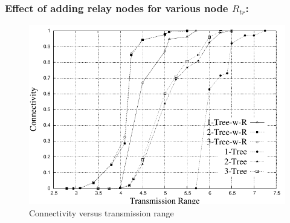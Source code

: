 \documentclass{beamer}
\newcommand{\SRCONN}   { {\mathrm {SR\mbox{-}CONN}} }
\begin{document}
\begin{frame}
\frametitle{Effect of adding relay nodes for various node $R_{tr}$:}

\begin{figure}[!htb]
\begin{minipage}{.9\linewidth}
\end{minipage}
\includegraphics[width=4 in, height=1.75 in]{NetworkI_woR-eps-converted-to.pdf}
\caption{Connectivity versus transmission range}
\label{Fig:NWOR}
\end{figure}

\end{frame}
%
%
%
% 
%
\end{document}
